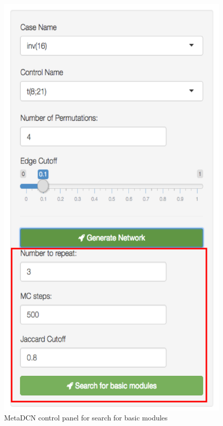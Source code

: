 \begin{steps}
\begin{figure}[H]
\begin{center}
\includegraphics[scale=0.35]{./figure/metaDCN/metaDCNstep2}
\caption{MetaDCN control panel for search for basic modules}
\label{fig:metaDCNstep2}
\end{center}
\end{figure}


\end{steps}

